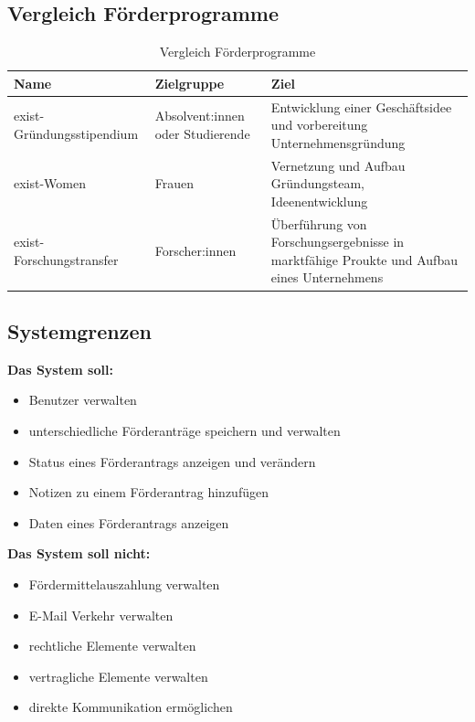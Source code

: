 \documentclass{article}
\begin{document}
\subsection{Vergleich Förderprogramme}
\begin{table}[htbp]
\centering

\begin{tabularx}{\textwidth}{l>{\raggedright\arraybackslash}p{3.5cm}>{\raggedright\arraybackslash}X}
\toprule
Name & Zielgruppe & Ziel & \\
\midrule
exist-Gründungsstipendium & Absolvent:innen oder Studierende & Entwicklung einer Geschäftsidee und vorbereitung Unternehmensgründung\\
exist-Women & Frauen & Vernetzung und Aufbau Gründungsteam, Ideenentwicklung\\
exist-Forschungstransfer & Forscher:innen & Überführung von Forschungsergebnisse in marktfähige Proukte und Aufbau eines Unternehmens\\
\bottomrule
\end{tabularx}
\caption{Vergleich Förderprogramme}
\end{table}

\newpage

\subsection{Systemgrenzen}
\textbf{Das System soll:}
\begin{itemize}
    \item Benutzer verwalten
    \item unterschiedliche Förderanträge speichern und verwalten
    \item Status eines Förderantrags anzeigen und verändern
    \item Notizen zu einem Förderantrag hinzufügen 
    \item Daten eines Förderantrags anzeigen
\end{itemize}
\newline
\textbf{Das System soll nicht:} 
\begin{itemize}
    \item Fördermittelauszahlung verwalten
    \item E-Mail Verkehr verwalten
    \item rechtliche Elemente verwalten
    \item vertragliche Elemente verwalten
    \item direkte Kommunikation ermöglichen
\end{itemize}
\end{document}
